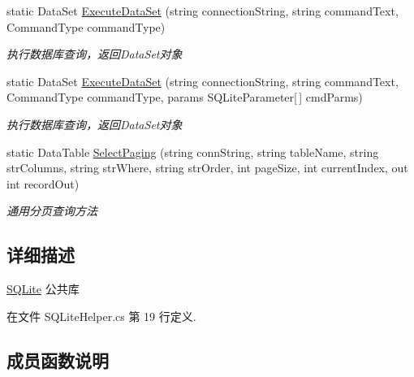 \begin{DoxyCompactItemize}
static Data\+Set \hyperlink{class_x_c_l_net_tools_1_1_data_base_1_1_s_q_lite_1_1_s_q_lite_helper_a4806433651289941b9507696bb3a64d0}{Execute\+Data\+Set} (string connection\+String, string command\+Text, Command\+Type command\+Type)
\begin{DoxyCompactList}\small\item\em 执行数据库查询，返回\+Data\+Set对象 \end{DoxyCompactList}\item 
static Data\+Set \hyperlink{class_x_c_l_net_tools_1_1_data_base_1_1_s_q_lite_1_1_s_q_lite_helper_a58876af7deacc80974cddb8b1feddee5}{Execute\+Data\+Set} (string connection\+String, string command\+Text, Command\+Type command\+Type, params S\+Q\+Lite\+Parameter\mbox{[}$\,$\mbox{]} cmd\+Parms)
\begin{DoxyCompactList}\small\item\em 执行数据库查询，返回\+Data\+Set对象 \end{DoxyCompactList}\item 
static Data\+Table \hyperlink{class_x_c_l_net_tools_1_1_data_base_1_1_s_q_lite_1_1_s_q_lite_helper_ac6c40082dce532c8ea61efc23c00a825}{Select\+Paging} (string conn\+String, string table\+Name, string str\+Columns, string str\+Where, string str\+Order, int page\+Size, int current\+Index, out int record\+Out)
\begin{DoxyCompactList}\small\item\em 通用分页查询方法 \end{DoxyCompactList}\end{DoxyCompactItemize}


\subsection{详细描述}
\hyperlink{namespace_x_c_l_net_tools_1_1_data_base_1_1_s_q_lite}{S\+Q\+Lite} 公共库 



在文件 S\+Q\+Lite\+Helper.\+cs 第 19 行定义.



\subsection{成员函数说明}
